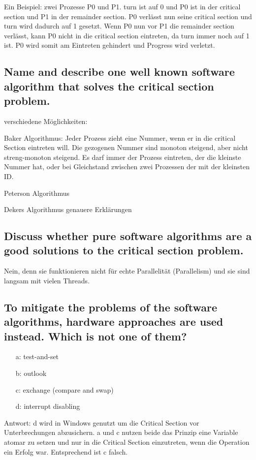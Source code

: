 Ein Beispiel: zwei Prozesse P0 und P1.
turn ist auf 0 und P0 ist in der critical section und P1 in der remainder section.
P0 verlässt nun seine critical section und turn wird dadurch auf 1 gesetzt.
Wenn P0 nun vor P1 die remainder section verlässt, kann P0 nicht in die critical section eintreten, da turn immer noch auf 1 ist.
P0 wird somit am Eintreten gehindert und Progress wird verletzt.

\subsection{Name and describe one well known software algorithm that solves the critical section problem.}
verschiedene Möglichkeiten:

Baker Algorithmus:
Jeder Prozess zieht eine Nummer, wenn er in die critical Section eintreten will.
Die gezogenen Nummer sind monoton steigend, aber nicht streng-monoton steigend.
Es darf immer der Prozess eintreten, der die kleinste Nummer hat, oder bei Gleichstand zwischen zwei Prozessen der mit der kleinsten ID\@.

Peterson Algorithmus

Dekers Algorithmus
\todo genauere Erklärungen

\subsection{Discuss whether pure software algorithms are a good solutions to the critical section problem.}
Nein, denn sie funktionieren nicht für echte Parallelität (Parallelism) und sie sind langsam mit vielen Threads.

\subsection{To mitigate the problems of the software algorithms, hardware approaches are used instead. Which is not one of them?}
\begin{itemize}
    \item[a:] test-and-set
    \item[b:] outlook
    \item[c:] exchange (compare and swap)
    \item[d:] interrupt disabling   
\end{itemize}
Antwort:
d wird in Windows genutzt um die Critical Section vor Unterbrechungen abzusichern.
a und c nutzen beide das Prinzip eine Variable atomar zu setzen und nur in die Critical Section einzutreten, wenn die Operation ein Erfolg war.
Entsprechend ist c falsch.

